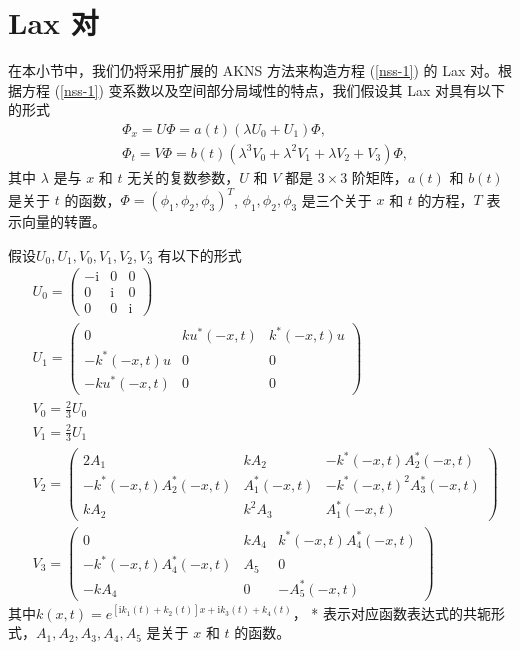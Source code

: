 \section{Lax 对}
在本小节中，我们仍将采用扩展的 AKNS 方法来构造方程 (\ref{nss-1}) 的 Lax 对。根据方程 (\ref{nss-1}) 变系数以及空间部分局域性的特点，我们假设其 Lax 对具有以下的形式
\begin{align}
  & \Phi_{x} = U\Phi = a(t)(\lambda U_{0} + U_{1})\Phi, \label{nss-2} \\
  & \Phi_{t} = V\Phi = b(t)(\lambda^{3}V_{0} + \lambda^{2}V_{1} + \lambda V_{2} + V_{3})\Phi, \label{nss-3}
\end{align}
其中 $\lambda$ 是与 $x$ 和 $t$ 无关的复数参数，$U$ 和 $V$ 都是 $3\times3$ 阶矩阵，$a(t)$ 和 $b(t)$ 是关于 $t$ 的函数，$\Phi=(\phi_1, \phi_2, \phi_3)^T$, $\phi_1, \phi_2, \phi_3$ 是三个关于 $x$ 和 $t$ 的方程，$T$ 表示向量的转置。

假设$U_{0}, U_{1}, V_{0}, V_{1}, V_{2}, V_{3}$ 有以下的形式
\begin{align}
  & U_{0} = \begin{pmatrix}
             -\mathrm{i} & 0 & 0 \\
              0 & \mathrm{i} & 0 \\
              0 & 0 & \mathrm{i}
            \end{pmatrix} \\
  & U_{1} = \begin{pmatrix}
              0 & ku^{*}(-x,t) & k^{*}(-x,t)u \\
              -k^{*}(-x,t)u & 0 & 0 \\
              -ku^{*}(-x,t) & 0 & 0
            \end{pmatrix} \\
  & V_{0} = \frac{2}{3}U_{0} \\
  & V_{1} = \frac{2}{3}U_{1} \\
  & V_{2} = \begin{pmatrix}
              2A_{1} & kA_{2} & -k^{*}(-x,t)A_{2}^{*}(-x,t) \\
              -k^{*}(-x,t)A_{2}^{*}(-x,t) & A_{1}^{*}(-x,t) & -k^{*}(-x,t)^{2}A_{3}^{*}(-x,t) \\
              kA_{2} & k^{2}A_{3} & A_{1}^{*}(-x,t)
            \end{pmatrix} \\
  & V_{3} = \begin{pmatrix}
              0 & kA_{4} & k^{*}(-x,t)A_{4}^{*}(-x,t) \\
              -k^{*}(-x,t)A_{4}^{*}(-x,t) & A_{5} & 0 \\
              -kA_{4} & 0 & -A_{5}^{*}(-x,t)
            \end{pmatrix}
\end{align}
其中$k(x,t)= e^{\left[\mathrm{i}k_{1}(t) + k_2(t)\right]x + \mathrm{i}k_{3}(t) + k_4(t)}$，  * 表示对应函数表达式的共轭形式，$A_1, A_2, A_3, A_4, A_5$ 是关于 $x$ 和 $t$ 的函数。

